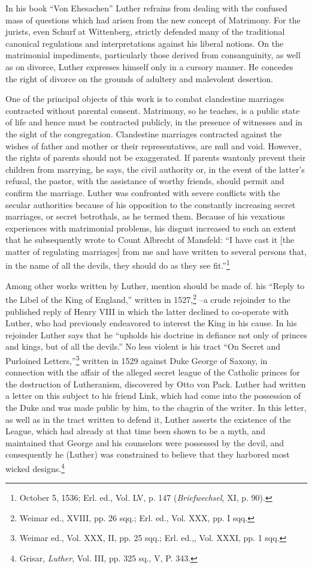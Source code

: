 In his book “Von Ehesachen” Luther refrains from dealing with the
confused mass of questions which had arisen from the new concept
of Matrimony. For the jurists, even Schurf at Wittenberg, strictly defended
many of the traditional canonical regulations and interpretations against
his liberal notions. On the matrimonial impediments,
particularly those derived from consanguinity, as well as on divorce,
Luther expresses himself only in a cursory manner. He concedes
the right of divorce on the grounds of adultery and malevolent desertion.

One of the principal objects of this work is to combat clandestine
marriages contracted without parental consent. Matrimony, so he
teaches, is a public state of life and hence must be contracted publicly,
in the presence of witnesses and in the sight of the congregation.
Clandestine marriages contracted against the wishes of father and
mother or their representatives, are null and void. However, the
rights of parents should not be exaggerated. If parents wantonly prevent
their children from marrying, he says, the civil authority or, in
the event of the latter’s refusal, the pastor, with the assistance of
worthy friends, should permit and confirm the marriage. Luther was
confronted with severe conflicts with the secular authorities because
of his opposition to the constantly increasing secret marriages, or
secret betrothals, as he termed them. Because of his vexatious experiences
with matrimonial problems, his disgust increased to such an extent
that he subsequently wrote to Count Albrecht of Mansfeld:
“I have cast it [the matter of regulating marriages] from me and have
written to several persons that, in the name of all the devils, they
should do as they see fit.”\footnote{October 5, 1536; Erl. ed., Vol. LV, p. 147 (\textit{Briefwechsel}, XI, p. 90).}

Among other works written by Luther, mention should be made of.
his “Reply to the Libel of the King of England,” written in 1527,\footnote{Weimar ed., XVIII, pp. 26 sqq.; Erl. ed., Vol. XXX, pp. I sqq.}
--a crude rejoinder to the published reply of Henry VIII in which
the latter declined to co-operate with Luther, who had previously endeavored
to interest the King in his cause. In his rejoinder Luther says
that he “upholds his doctrine in defiance not only of princes and
kings, but of all the devils.” No less violent is his tract “On Secret and
Purloined Letters,”\footnote{Weimar ed., Vol. XXX, II, pp. 25 sqq.; Erl. ed.,, Vol. XXXI, pp. 1 sqq.}
 written in 1529 against Duke George of Saxony,
in connection with the affair of the alleged secret league of the Catholic
princes for the destruction of Lutheranism, discovered by Otto
von Pack. Luther had written a letter on this subject to his friend
Link, which had come into the possession of the Duke and was made
public by him, to the chagrin of the writer. In this letter, as well as
in the tract written to defend it, Luther asserts the existence of the
League, which had already at that time been shown to be a myth, and
maintained that George and his counselors were possessed by the devil,
and consequently he (Luther) was constrained to believe that they
harbored most wicked designs.\footnote{Grisar, \textit{Luther}, Vol. III, pp. 325 sq., V, P. 343.}

